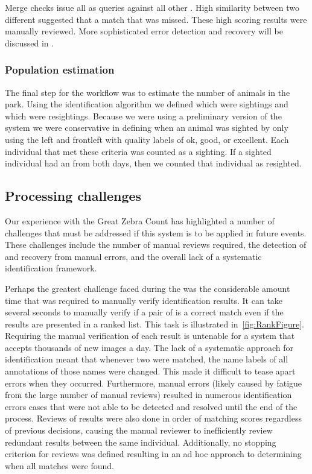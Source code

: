             Merge checks issue all \exemplars{} as queries against all other \exemplars{}. High similarity between
            two different \names{} suggested that a match that was missed. These high scoring results were manually
            reviewed. More sophisticated error detection and recovery will be discussed in .

        \subsubsection{Population estimation}
            The final step for the \GZC{} workflow was to estimate the number of animals in the park.
            Using the identification algorithm we defined which \annots{} were sightings and which were
              resightings.
            Because we were using a preliminary version of the system we were conservative in defining when an
              animal was sighted by only using the left and frontleft \annots{} with quality labels of ok, good, or
              excellent.
            Each individual that met these criteria was counted as a sighting.
            If a sighted individual had an \annot{} from both days, then we counted that individual as resighted.

    \subsection{Processing challenges}
        Our experience with the Great Zebra Count has highlighted a number of challenges that must be addressed if this
        system is to be applied in future events. These challenges include the number of manual reviews required, the
        detection of and recovery from manual errors, and the overall lack of a systematic identification framework.

        Perhaps the greatest challenge faced during the \GZC{} was the considerable amount time that was required
          to manually verify identification results.
        It can take several seconds to manually verify if a pair of \annots{} is a correct match even if the
          results are presented in a ranked list.
        This task is illustrated in~\cref{fig:RankFigure}.
        Requiring the manual verification of each result is untenable for a system that accepts thousands of new
          images a day.
        The lack of a systematic approach for identification meant that whenever two \annots{} were matched, the
          name labels of all annotations of those names were changed.
        This made it difficult to tease apart errors when they occurred.
        Furthermore, manual errors (likely caused by fatigue from the large number of manual reviews) resulted in
          numerous identification errors cases that were not able to be detected and resolved until the end of the
          process.
        Reviews of results were also done in order of matching scores regardless of previous decisions, causing
          the manual reviewer to inefficiently review redundant results between the same individual.
        Additionally, no stopping criterion for reviews was defined resulting in an ad hoc approach to
          determining when all matches were found.

